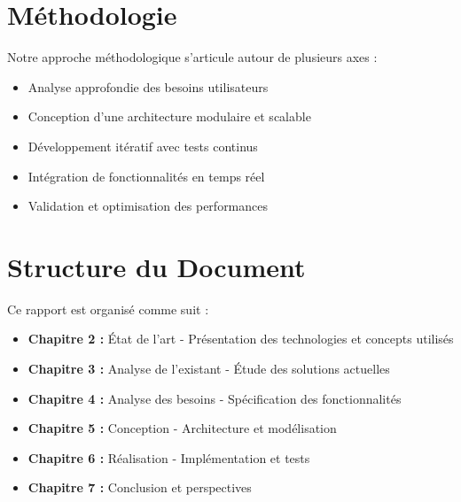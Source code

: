 \section{Méthodologie}
Notre approche méthodologique s'articule autour de plusieurs axes :
\begin{itemize}
    \item Analyse approfondie des besoins utilisateurs
    \item Conception d'une architecture modulaire et scalable
    \item Développement itératif avec tests continus
    \item Intégration de fonctionnalités en temps réel
    \item Validation et optimisation des performances
\end{itemize}

\section{Structure du Document}
Ce rapport est organisé comme suit :
\begin{itemize}
    \item \textbf{Chapitre 2 :} État de l'art - Présentation des technologies et concepts utilisés
    \item \textbf{Chapitre 3 :} Analyse de l'existant - Étude des solutions actuelles
    \item \textbf{Chapitre 4 :} Analyse des besoins - Spécification des fonctionnalités
    \item \textbf{Chapitre 5 :} Conception - Architecture et modélisation
    \item \textbf{Chapitre 6 :} Réalisation - Implémentation et tests
    \item \textbf{Chapitre 7 :} Conclusion et perspectives
\end{itemize} 